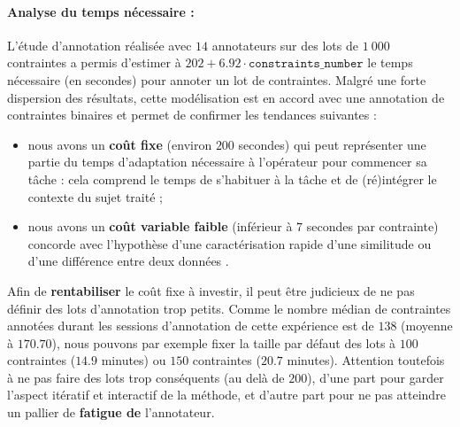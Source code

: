 			\paragraph{Analyse du temps nécessaire :}
			L'étude d'annotation réalisée avec $14$ annotateurs sur des lots de $1~000$ contraintes a permis d'estimer à $202 + 6.92 \cdot \texttt{constraints\_number}$ le temps nécessaire (en secondes) pour annoter un lot de contraintes.
			Malgré une forte dispersion des résultats, cette modélisation est en accord avec une annotation de contraintes binaires et permet de confirmer les tendances suivantes :
			\begin{itemize}
				\item nous avons un \textbf{coût fixe} (environ $200$ secondes) qui peut représenter une partie du temps d'adaptation nécessaire à l'opérateur pour commencer sa tâche  : cela comprend le temps de s'habituer à la tâche et de (ré)intégrer le contexte du sujet traité ;
				\item nous avons un \textbf{coût variable faible} (inférieur à $7$ secondes par contrainte) concorde avec l'hypothèse d'une caractérisation rapide d'une similitude ou d'une différence entre deux données .
			\end{itemize}
			Afin de \textbf{rentabiliser} le coût fixe à investir, il peut être judicieux de ne pas définir des lots d’annotation trop petits. 
			Comme le nombre médian de contraintes annotées durant les sessions d'annotation de cette expérience est de $138$ (moyenne à $170.70$), nous pouvons par exemple fixer la taille par défaut des lots à $100$ contraintes ($14.9$ minutes) ou $150$ contraintes ($20.7$ minutes).
			Attention toutefois à ne pas faire des lots trop conséquents (au delà de $200$), d'une part pour garder l'aspect itératif et interactif de la méthode, et d'autre part pour ne pas atteindre un pallier de \textbf{fatigue de} l'annotateur.


